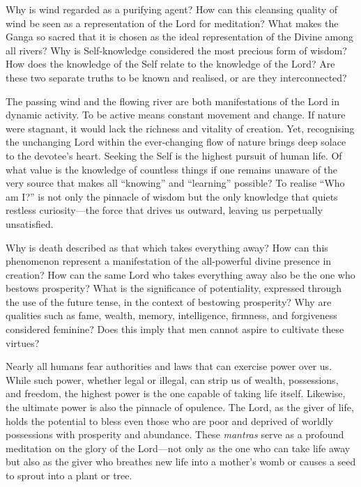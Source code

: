 \newpage
\begin{mananam}{}
\normalfont\mananamtext Why is wind regarded as a purifying agent? How can this cleansing quality of wind be seen as a representation of the Lord for meditation? 
What makes the Ganga so sacred that it is chosen as the ideal representation of the Divine among all rivers? 
Why is Self-knowledge considered the most precious form of wisdom? How does the knowledge of the Self relate to the knowledge of the Lord? Are these two separate truths to be known and realised, or are they interconnected?
\end{mananam}
\sreflect
\begin{inspiration}{}
\normalfont\mananamtext The passing wind and the flowing river are both manifestations of the Lord in dynamic activity. To be active means constant movement and change. If nature were stagnant, it would lack the richness and vitality of creation. Yet, recognising the unchanging Lord within the ever-changing flow of nature brings deep solace to the devotee’s heart.
Seeking the Self is the highest pursuit of human life. Of what value is the knowledge of countless things if one remains unaware of the very source that makes all “knowing” and “learning” possible? To realise “Who am I?” is not only the pinnacle of wisdom but the only knowledge that quiets restless curiosity—the force that drives us outward, leaving us perpetually unsatisfied.
\end{inspiration}

\newpage
\begin{mananam}{}
\normalfont\mananamtext Why is death described as that which takes everything away? How can this phenomenon represent a manifestation of the all-powerful divine presence in creation?
How can the same Lord who takes everything away also be the one who bestows prosperity? What is the significance of potentiality, expressed through the use of the future tense, in the context of bestowing prosperity? 
Why are qualities such as fame, wealth, memory, intelligence, firmness, and forgiveness considered feminine? Does this imply that men cannot aspire to cultivate these virtues?
\end{mananam}
\sreflect
\begin{inspiration}{}
\normalfont\mananamtext Nearly all humans fear authorities and laws that can exercise power over us. While such power, whether legal or illegal, can strip us of wealth, possessions, and freedom, the highest power is the one capable of taking life itself.
Likewise, the ultimate power is also the pinnacle of opulence. The Lord, as the giver of life, holds the potential to bless even those who are poor and deprived of worldly possessions with prosperity and abundance.
These \emph{mantras} serve as a profound meditation on the glory of the Lord—not only as the one who can take life away but also as the giver who breathes new life into a mother’s womb or causes a seed to sprout into a plant or tree.
\end{inspiration}
\newpage

